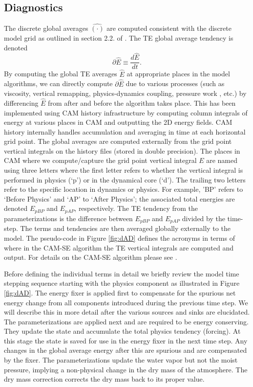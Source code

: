 \documentclass[draft,linenumbers]{agujournal}
\newcommand*{\gi}[1]{\widehat{#1}}
\begin{document}
\subsection{Diagnostics}\label{sec:diagnostics}
The discrete global averages $\gi{(\cdot)}$ are computed consistent with the discrete model grid as outlined in section 2.2. of \citet{LBDL2014JAMES}. The TE global average tendency is denoted
\begin{equation}
\partial \gi{E}\equiv \frac{d\gi{E}}{dt}.
\end{equation}
By computing the global TE averages $\gi{E}$ at appropriate places in the model algorithms, we can directly compute $\partial \gi{E}$ due to various processes (such as viscosity, vertical remapping, physics-dynamics coupling, pressure work {\color{red}{error}}, etc.) by differencing $\gi{E}$ from after and before the algorithm takes place. This has been implemented using CAM history infrastructure by computing column integrals of energy at various places in CAM and outputting the 2D energy fields. CAM history internally handles accumulation and averaging in time at each horizontal grid point. The global averages are computed externally from the grid point vertical integrals on the history files (stored in double precision). The places in CAM where we compute/capture the grid point vertical integral $E$ are named using three letters where the first letter refers to whether the vertical integral is performed in physics (`p') or in the dynamical core (`d'). The trailing two letters refer to the specific location in dynamics or physics. For example, 'BP' refers to `Before Physics' and `AP' to `After Physics'; the associated total energies are denoted ${E}_{pBP}$ and ${E}_{pAP}$, respectively. The TE tendency from the parameterizations is the difference between ${E}_{pBP}$ and ${E}_{pAP}$ divided by the time-step. The terms and tendencies are then averaged globally externally to the model. The pseudo-code in Figure \ref{fig:dAD} defines the acronyms in terms of where in the CAM-SE algorithm the TE vertical integrals are computed and output. For details on the CAM-SE algorithm please see \citet{LetAl2018JAMES}.

Before defining the individual terms in detail we briefly review the model time stepping sequence starting with the physics component as illustrated in Figure \ref{fig:dAD}. The energy fixer is applied first to compensate for the spurious net energy change from all components introduced during the previous time step. We will describe this in more detail after the various sources and sinks are elucidated. The parameterizations are applied next and are required to be energy conserving. They update the state and accumulate the total physics tendency (forcing). At this stage the state is saved for use in the energy fixer in the next time step. Any changes in the global average energy after this are spurious and are compensated by the fixer. The parameterizations update the water vapor but not the moist pressure, implying a non-physical change in the dry mass of the atmosphere. The dry mass correction corrects the dry mass back to its proper value.
\end{document}
